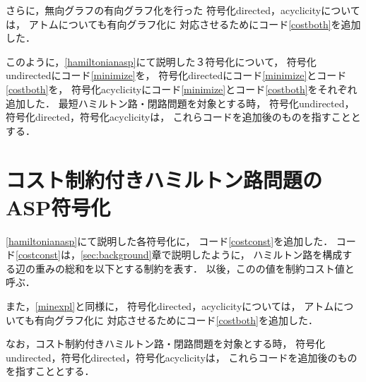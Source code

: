 
さらに，無向グラフの有向グラフ化を行った
符号化directed，acyclicityについては，
アトムについても有向グラフ化に
対応させるためにコード\ref{costboth}を追加した．

このように，\ref{hamiltonianasp}にて説明した３符号化について，
符号化undirectedにコード\ref{minimize}を，
符号化directedにコード\ref{minimize}とコード\ref{costboth}を，
符号化acyclicityにコード\ref{minimize}とコード\ref{costboth}をそれぞれ追加した．
最短ハミルトン路・閉路問題を対象とする時，
符号化undirected，符号化directed，符号化acyclicityは，
これらコードを追加後のものを指すこととする．
\section{コスト制約付きハミルトン路問題のASP符号化}

\ref{hamiltonianasp}にて説明した各符号化に，
コード\ref{costconst}を追加した．
コード\ref{costconst}は，\ref{sec:background}章で説明したように，
ハミルトン路を構成する辺の重みの総和を以下とする制約を表す．
以後，このの値を制約コスト値と呼ぶ．

また，\ref{minexpl}と同様に，
符号化directed，acyclicityについては，
アトムについても有向グラフ化に
対応させるためにコード\ref{costboth}を追加した．

なお，コスト制約付きハミルトン路・閉路問題を対象とする時，
符号化undirected，符号化directed，符号化acyclicityは，
これらコードを追加後のものを指すこととする．
